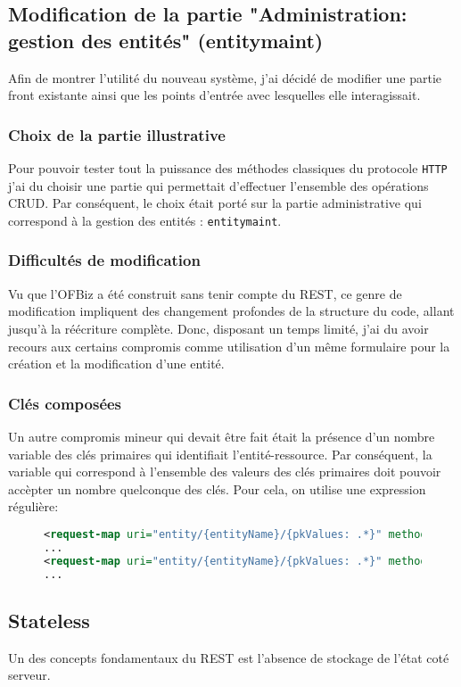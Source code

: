 \subsection{Modification de la partie "Administration: gestion des entités"  (entitymaint)  }
Afin de montrer l'utilité du nouveau système, j'ai décidé de modifier une partie front existante ainsi que les points d'entrée avec lesquelles elle interagissait.
\subsubsection{Choix de la partie illustrative}
Pour pouvoir tester tout la puissance des méthodes classiques du protocole \verb|HTTP| j'ai du choisir une partie qui permettait d'effectuer l'ensemble des opérations CRUD. Par conséquent, le choix était porté sur la partie administrative qui correspond à la gestion des entités : \verb|entitymaint|.
\subsubsection{Difficultés de modification} 
Vu que l'OFBiz a été construit sans tenir compte du REST, ce genre de modification impliquent des changement profondes de la structure du code, allant jusqu'à la réécriture complète. Donc, disposant un temps limité, j'ai du avoir recours aux certains compromis comme utilisation d'un même formulaire pour la création et la modification d'une entité.
\subsubsection{Clés composées}
Un autre compromis mineur qui devait être fait était la présence d'un nombre variable des clés primaires qui identifiait l'entité-ressource. Par conséquent, la variable qui correspond à l'ensemble des valeurs des clés primaires doit pouvoir accèpter un nombre quelconque des clés. Pour cela, on utilise une expression régulière: 

\begin{figure}[h!]
	\begin{lstlisting}[frame=leftline,language=xml,frameround=tttt]
<request-map uri="entity/{entityName}/{pkValues: .*}" method="get">
...
<request-map uri="entity/{entityName}/{pkValues: .*}" method="delete">
...

	\end{lstlisting}
\end{figure}  
\subsection{Stateless}
Un des concepts fondamentaux du REST est l'absence de stockage de l'état coté serveur. 
